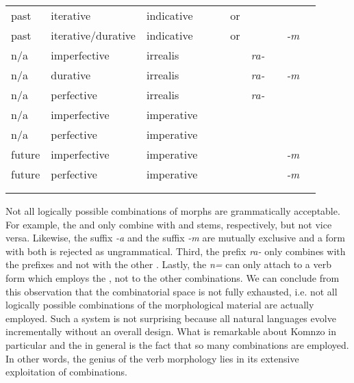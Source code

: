 \begin{sidewaystable}
{\begin{tabular}{lllc|c|c|c|c|c|c|}
	past&iterative&indicative&\multicolumn{1}{c}{}&&\Betaone{} or \Betatwo&&\Rs&\multicolumn{2}{c}{}\\\cline{6-6}\cline{8-9}
	past&iterative/durative&indicative&\multicolumn{1}{c}{}&&\Betaone{} or \Betatwo&&\Rs&\emph{-m}&\multicolumn{1}{c}{}\\\cline{6-9}
	n/a&imperfective&irrealis&\multicolumn{1}{c}{}&&\Bet&\emph{ra-}&\Ext&\multicolumn{2}{c}{}\\\cline{6-9}
	n/a&durative&irrealis&\multicolumn{1}{c}{}&&\Bet&\emph{ra-}&\Ext&\emph{-m}&\multicolumn{1}{c}{}\\\cline{6-9}
	n/a&perfective&irrealis&\multicolumn{1}{c}{}&&\Bet&\emph{ra-}&\Rs&\multicolumn{2}{c}{}\\\cline{6-8}\cline{10-10}
	n/a&imperfective&imperative&\multicolumn{1}{c}{}&&\Bet&&\Ext&\multicolumn{1}{c|}{}&{\Imp}\\\cline{6-6}\cline{8-8}\cline{10-10}
	n/a&perfective&imperative&\multicolumn{1}{c}{}&&\Bet&&\Rs&\multicolumn{1}{c|}{}&{\Imp}\\\cline{6-6}\cline{8-10}
	future&imperfective&imperative&\multicolumn{1}{c}{}&&\Bet&&\Ext&\emph{-m}&{\Imp}\\\cline{6-6}\cline{8-10}
	future&perfective&imperative&\multicolumn{1}{c}{}&&\Bet&&\Rs&\emph{-m}&{\Imp}\\\cline{6-6}\cline{8-10}
	\multicolumn{9}{c}{}\\
	\lspbottomrule
\end{tabular}
}
\end{sidewaystable} 

Not all logically possible combinations of morphs are grammatically acceptable. For example, the \Alph{} and \Gam{}  only combine with {\Ext} and {\Rs} stems, respectively, but not vice versa. Likewise, the  suffix \emph{-a} and the  suffix \emph{-m} are mutually exclusive and a  form with both is rejected as ungrammatical. Third, the  prefix \emph{ra-} only combines with the \Bet{} prefixes and not with the other . Lastly, the   \emph{n=} can only attach to a verb form which employs the \Alph{} , not to the other combinations. We can conclude from this observation that the combinatorial space is not fully exhausted, i.e. not all logically possible combinations of the morphological material are actually employed. Such a system is not surprising because all natural languages evolve incrementally without an overall design. What is remarkable about Komnzo in particular and the  in general is the fact that so many combinations are employed. In other words, the genius of the verb morphology lies in its extensive exploitation of combinations.

